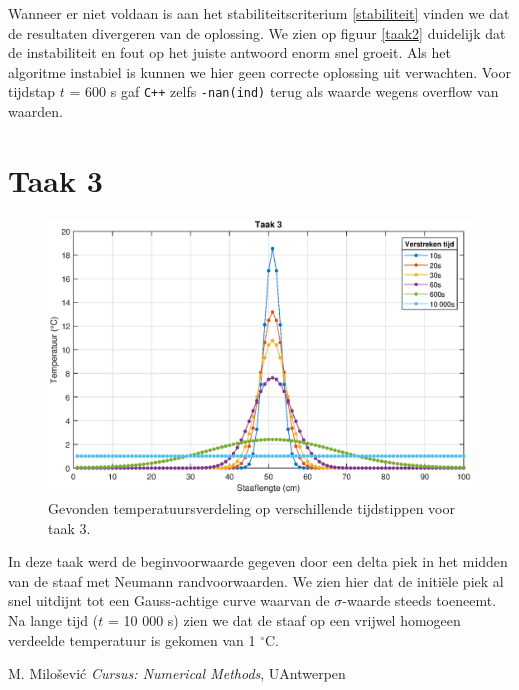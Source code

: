 \documentclass[a4paper,11pt]{article}
\begin{document}
  \noindent
  Wanneer er niet voldaan is aan het stabiliteitscriterium \eqref{stabiliteit} vinden we dat de resultaten divergeren van de oplossing. We zien op figuur \ref{taak2} duidelijk dat de instabiliteit en fout op het juiste antwoord enorm snel groeit. Als het algoritme instabiel is kunnen we hier geen correcte oplossing uit verwachten. Voor tijdstap $t$ = 600 s gaf \texttt{C++} zelfs \texttt{-nan(ind)} terug als waarde wegens overflow van waarden.

\newpage
\section*{Taak 3}
  \FloatBarrier
  \begin{figure}[ht!]
    \includegraphics[width = \textwidth]{taak3.eps}
    \caption{Gevonden temperatuursverdeling op verschillende tijdstippen voor taak 3.}
    \label{taak3}
  \end{figure}
  \FloatBarrier

  \noindent
  In deze taak werd de beginvoorwaarde gegeven door een delta piek in het midden van de staaf met Neumann randvoorwaarden. We zien hier dat de initi\"ele piek al snel uitdijnt tot een Gauss-achtige curve waarvan de $\sigma$-waarde steeds toeneemt. Na lange tijd ($t$ = 10 000 s) zien we dat de staaf op een vrijwel homogeen verdeelde temperatuur is gekomen van 1 $^\circ$C.

\begin{thebibliography}{99}
   M. Milo\v{s}evi\'c \textit{Cursus: Numerical Methods}, UAntwerpen
\end{thebibliography}
\end{document}
